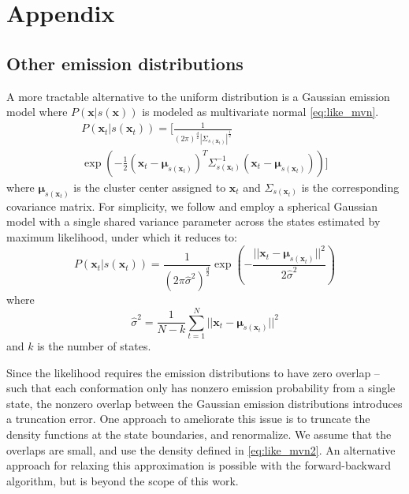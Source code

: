 \documentclass[journal=jpcbfk, layout=traditional, manuscript=article]{achemso}
\begin{document}


\section{Appendix}
\subsection{Other emission distributions}

A more tractable alternative to the uniform distribution is a Gaussian emission model where $P(\mathbf{x} | s(\mathbf{x}))$ is modeled as multivariate normal \cref{eq:like_mvn}.
\begin{equation}
\label{eq:like_mvn}
\begin{split}
P(\mathbf{x}_t | s(\mathbf{x}_t)) = \Bigg[ \frac{1}{(2 \pi)^\frac{d}{2} |\Sigma_{s(\mathbf{x}_t)}|^\frac{1}{2}} \\
   \exp\left(-\frac{1}{2} (\mathbf{x}_t - \bm{\mu}_{s(\mathbf{x}_t)})^T \Sigma_{s(\mathbf{x}_t)}^{-1} (\mathbf{x}_t - \bm{\mu}_{s(\mathbf{x}_t)})\right)\Bigg] 
\end{split}
\end{equation} where $\bm{\mu}_{s(\mathbf{x}_t)}$ is the cluster center assigned to $\mathbf{x}_t$ and $\Sigma_{s(\mathbf{x}_t)}$ is the corresponding covariance matrix. For simplicity, we follow \citet{Pelleg2000Xmeans} and employ a spherical Gaussian model with a single shared variance parameter across the states estimated by maximum likelihood, under which it reduces to:
\begin{equation}
\label{eq:like_mvn2}
 P(\mathbf{x}_t | s(\mathbf{x}_t)) = \frac{1}{\left(2 \pi \hat{\sigma}^2\right)^{\frac{d}{2}}} \exp\left(-\frac{||\mathbf{x}_t - \bm{\mu}_{s(\mathbf{x}_t)}||^2}{2 \hat{\sigma}^2} \right)
\end{equation} where
\begin{equation}
\label{eq:mle_sigma}
\hat{\sigma}^2 = \frac{1}{N - k} \sum_{t=1}^N || \mathbf{x}_t - \bm{\mu}_{s(\mathbf{x}_t)} ||^2
\end{equation} and $k$ is the number of states.

Since the likelihood requires the emission distributions to have zero overlap -- such that each conformation only has nonzero emission probability from a single state, the nonzero overlap between the Gaussian emission distributions introduces a truncation error. One approach to ameliorate this issue is to truncate the density functions at the state boundaries, and renormalize. We assume that the overlaps are small, and use the density defined in \cref{eq:like_mvn2}. An alternative approach for relaxing this approximation is possible with the forward-backward algorithm,\cite{Rabiner1989Tutorial} but is beyond the scope of this work.
\end{document}
